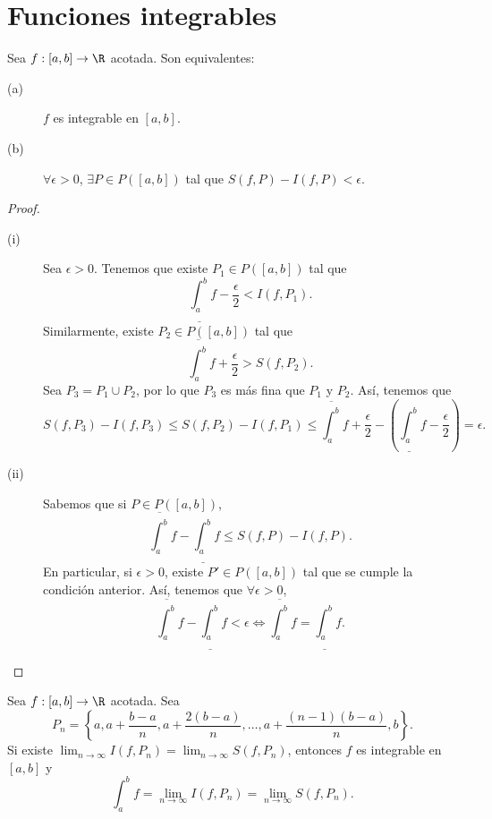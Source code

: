 \section{Funciones integrables}
\begin{ftheorem}
	\normalfont Sea $\displaystyle f : [a,b] \to \R$ acotada. Son equivalentes:
	\begin{description}
		\item[(a)] $\displaystyle f $ es integrable en $\displaystyle [a,b] $.
		\item[(b)] $\displaystyle \forall \epsilon > 0 $, $\displaystyle \exists P \in P\left([a,b]\right) $ tal que $\displaystyle S\left(f,P\right)-I\left(f,P\right) < \epsilon  $.
	\end{description}
\end{ftheorem}
\begin{proof}
\begin{description}
	\item[(i)] Sea $\displaystyle \epsilon > 0 $. Tenemos que existe $\displaystyle P_{1} \in P\left(\left[a,b\right] \right) $ tal que 
		\[ \underline{\int^{b}_{a}} f  - \frac{\epsilon }{2} < I\left(f,P_{1}\right) .\]
		Similarmente, existe $\displaystyle P_{2} \in P\left(\left[a,b\right] \right) $ tal que 
		\[ \overline{\int^{b}_{a}} f + \frac{\epsilon }{2} > S\left(f,P_{2}\right)  .\]
	Sea $\displaystyle P_{3} = P_{1} \cup P_{2} $, por lo que $\displaystyle P_{3} $ es más fina que $\displaystyle P_{1} $ y $\displaystyle P_{2} $. Así, tenemos que 
	\[ S\left(f,P_{3}\right)-I\left(f,P_{3}\right) \leq S\left(f,P_{2}\right)-I\left(f,P_{1}\right) \leq \overline{\int^{b}_{a}} f + \frac{\epsilon }{2} - \left(\underline{\int^{b}_{a}} f - \frac{\epsilon }{2}\right) = \epsilon   .\]
\item[(ii)] Sabemos que si $\displaystyle P \in P\left([a,b]\right) $,
	\[ \overline{\int^{b}_{a}}  f - \underline{\int^{b}_{a}} f \leq S\left(f,P\right) - I\left(f,P\right).\]
	En particular, si $\displaystyle \epsilon > 0 $, existe $\displaystyle P' \in P\left([a,b]\right) $ tal que se cumple la condición anterior. Así, tenemos que $\displaystyle \forall \epsilon > 0 $,
	\[ \overline{\int^{b}_{a}} f -\underline{\int^{b}_{a}} f < \epsilon \iff \overline{\int^{b}_{a}} f = \underline{\int^{b}_{a}} f .\]
\end{description}
\end{proof}
\begin{fprop}[]
	\normalfont Sea $\displaystyle f : \left[a,b\right] \to \R $ acotada. Sea 
	\[ P_{n} = \left\{ a, a + \frac{b-a}{n}, a + \frac{2\left(b-a\right)}{n}, \ldots, a + \frac{\left(n-1\right)\left(b-a\right)}{n}, b\right\} .\]
	Si existe $\displaystyle \lim_{n \to \infty}I\left(f,P_{n}\right) = \lim_{n \to \infty}S\left(f,P_{n}\right) $, entonces $\displaystyle f $ es integrable en $\displaystyle [a,b] $ y 
	\[ \int^{b}_{a} f = \lim_{n \to \infty}I\left(f,P_{n}\right) = \lim_{n \to \infty}S\left(f,P_{n}\right) .\]
\end{fprop}
